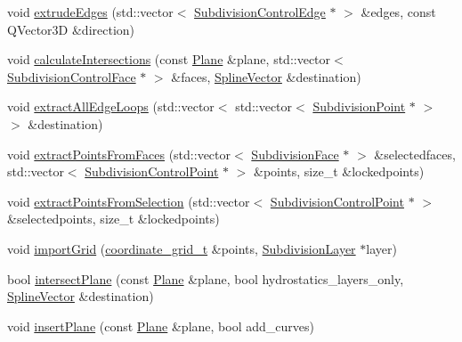 \begin{DoxyCompactItemize}
void \hyperlink{classShipCAD_1_1SubdivisionSurface_ac19570e1402deab738d2231d6bec9650}{extrude\-Edges} (std\-::vector$<$ \hyperlink{classShipCAD_1_1SubdivisionControlEdge}{Subdivision\-Control\-Edge} $\ast$ $>$ \&edges, const Q\-Vector3\-D \&direction)
\item 
void \hyperlink{classShipCAD_1_1SubdivisionSurface_a9fa189058cbdc190d8847c976fd4ae06}{calculate\-Intersections} (const \hyperlink{classShipCAD_1_1Plane}{Plane} \&plane, std\-::vector$<$ \hyperlink{classShipCAD_1_1SubdivisionControlFace}{Subdivision\-Control\-Face} $\ast$ $>$ \&faces, \hyperlink{namespaceShipCAD_a053b941b2c87049bb9380428d4d5a056}{Spline\-Vector} \&destination)
\item 
void \hyperlink{classShipCAD_1_1SubdivisionSurface_a17dccf4965b49427d345bd5acce897c5}{extract\-All\-Edge\-Loops} (std\-::vector$<$ std\-::vector$<$ \hyperlink{classShipCAD_1_1SubdivisionPoint}{Subdivision\-Point} $\ast$ $>$ $>$ \&destination)
\item 
void \hyperlink{classShipCAD_1_1SubdivisionSurface_af62ba549d058dfddd4bfa1b69a577220}{extract\-Points\-From\-Faces} (std\-::vector$<$ \hyperlink{classShipCAD_1_1SubdivisionFace}{Subdivision\-Face} $\ast$ $>$ \&selectedfaces, std\-::vector$<$ \hyperlink{classShipCAD_1_1SubdivisionControlPoint}{Subdivision\-Control\-Point} $\ast$ $>$ \&points, size\-\_\-t \&lockedpoints)
\item 
void \hyperlink{classShipCAD_1_1SubdivisionSurface_af0f0d7bb979c8c8ba04b9be26e7cfe30}{extract\-Points\-From\-Selection} (std\-::vector$<$ \hyperlink{classShipCAD_1_1SubdivisionControlPoint}{Subdivision\-Control\-Point} $\ast$ $>$ \&selectedpoints, size\-\_\-t \&lockedpoints)
\item 
void \hyperlink{classShipCAD_1_1SubdivisionSurface_aa193fd28425e9846908479615e7c5bf9}{import\-Grid} (\hyperlink{classShipCAD_1_1SubdivisionSurface_a8ed657cb7d4cd34662bd2d3e949d3e3b}{coordinate\-\_\-grid\-\_\-t} \&points, \hyperlink{classShipCAD_1_1SubdivisionLayer}{Subdivision\-Layer} $\ast$layer)
\item 
bool \hyperlink{classShipCAD_1_1SubdivisionSurface_a86961ff2a6421d778814c013c3d2b8d7}{intersect\-Plane} (const \hyperlink{classShipCAD_1_1Plane}{Plane} \&plane, bool hydrostatics\-\_\-layers\-\_\-only, \hyperlink{namespaceShipCAD_a053b941b2c87049bb9380428d4d5a056}{Spline\-Vector} \&destination)
\item 
void \hyperlink{classShipCAD_1_1SubdivisionSurface_ada26b740ea1f317763b6ecd372f13ea2}{insert\-Plane} (const \hyperlink{classShipCAD_1_1Plane}{Plane} \&plane, bool add\-\_\-curves)

\end{DoxyCompactItemize}
